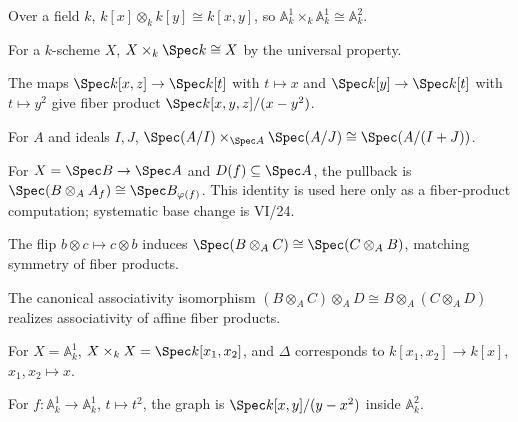 \begin{example}\label{ex:vi23-r01}
Over a field $k$, $k[x]\otimes_k k[y]\cong k[x,y]$, so $\mathbb A^1_k\times_k\mathbb A^1_k\cong\mathbb A^2_k$.
\end{example}

\begin{example}\label{ex:vi23-r02}
For a $k$-scheme $X$, $X\times_k\Spec k\cong X$ by the universal property.
\end{example}

\begin{example}\label{ex:vi23-r03}
The maps $\Spec k[x,z]\to\Spec k[t]$ with $t\mapsto x$ and $\Spec k[y]\to\Spec k[t]$ with $t\mapsto y^2$ give fiber product $\Spec k[x,y,z]/(x-y^2)$.
\end{example}

\begin{example}\label{ex:vi23-r04}
For $A$ and ideals $I,J$, $\Spec(A/I)\times_{\Spec A}\Spec(A/J)\cong\Spec(A/(I+J))$.
\end{example}

\begin{example}\label{ex:vi23-r05}
For $X=\Spec B\to\Spec A$ and $D(f)\subseteq\Spec A$, the pullback is $\Spec(B\otimes_AA_f)\cong\Spec B_{\varphi(f)}$. This identity is used here only as a fiber-product computation; systematic base change is VI/24.
\end{example}

\begin{example}[Symmetry]\label{ex:vi23-r06}
The flip $b\otimes c\mapsto c\otimes b$ induces $\Spec(B\otimes_AC)\cong\Spec(C\otimes_AB)$, matching symmetry of fiber products.
\end{example}

\begin{example}[Associativity]\label{ex:vi23-r07}
The canonical associativity isomorphism $(B\otimes_AC)\otimes_AD\cong B\otimes_A(C\otimes_AD)$ realizes associativity of affine fiber products.
\end{example}

\begin{example}\label{ex:vi23-r08}
For $X=\mathbb A^1_k$, $X\times_kX=\Spec k[x_1,x_2]$, and $\Delta$ corresponds to $k[x_1,x_2]\to k[x]$, $x_1,x_2\mapsto x$.
\end{example}

\begin{example}\label{ex:vi23-r09}
For $f:\mathbb A^1_k\to\mathbb A^1_k$, $t\mapsto t^2$, the graph is $\Spec k[x,y]/(y-x^2)$ inside $\mathbb A^2_k$.
\end{example}

